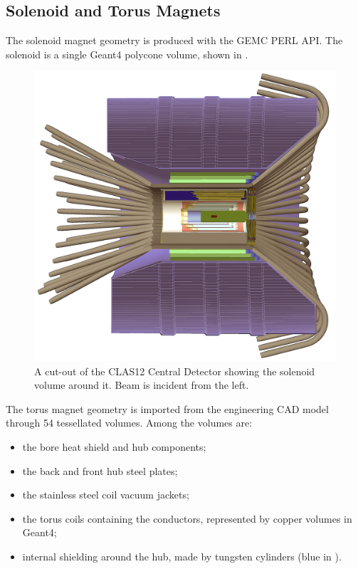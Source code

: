 \subsection{Solenoid and Torus Magnets}

The solenoid magnet geometry is produced with the GEMC PERL API. The solenoid is a single Geant4 polycone volume,
shown in .

\begin{figure}[h]
	\centering
	\includegraphics[width=0.99\columnwidth,keepaspectratio]{img/solenoid.png}
        \caption{A cut-out of the CLAS12 Central Detector showing the solenoid volume around it. Beam is incident from the
          left.}
	\label{fig:solenoid}
\end{figure}

The torus magnet geometry is imported from the engineering CAD model through 54 tessellated volumes. Among the
volumes are:

\begin{itemize}
	\item the bore heat shield and hub components;
	\item the back and front hub steel plates;
	\item the stainless steel coil vacuum jackets;
	\item the torus coils containing the conductors, represented by copper volumes in Geant4;
	\item internal shielding around the hub, made by tungsten cylinders (blue in ).
\end{itemize}

